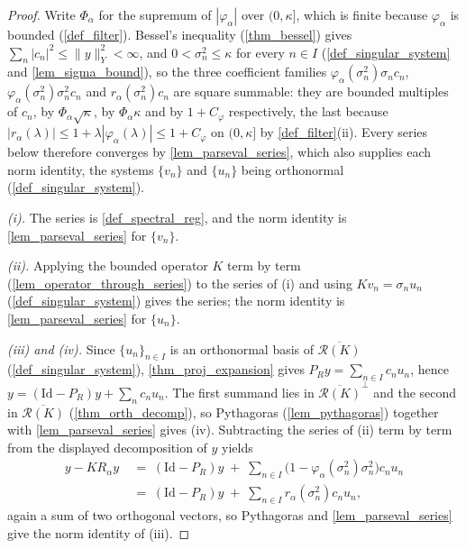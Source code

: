 \documentclass[a4paper]{report}
\theoremstyle{plain}
\theoremstyle{definition}
\theoremstyle{remark}
\newcommand{\Ran}{\mathcal{R}}
\newcommand{\Id}{\mathrm{Id}}
\begin{document}
\begin{proof}
  Write $\Phi_{\alpha}$ for the supremum of $|\varphi_{\alpha}|$ over $(0,\kappa]$,
  which is finite because $\varphi_{\alpha}$ is bounded (\cref{def_filter}).  Bessel's
  inequality
  (\cref{thm_bessel}) gives $\sum_n |c_n|^{2} \le \|y\|_Y^{2} < \infty$, and
  $0 < \sigma_n^{2} \le \kappa$ for every $n \in I$ (\cref{def_singular_system} and
  \cref{lem_sigma_bound}), so the three
  coefficient families $\varphi_{\alpha}(\sigma_n^{2})\sigma_nc_n$,
  $\varphi_{\alpha}(\sigma_n^{2})\sigma_n^{2}c_n$ and $r_{\alpha}(\sigma_n^{2})c_n$ are
  square summable: they are bounded multiples of $c_n$, by $\Phi_{\alpha}\sqrt{\kappa}$,
  by $\Phi_{\alpha}\kappa$ and by $1 + C_{\varphi}$ respectively, the last because
  $|r_{\alpha}(\lambda)| \le 1 + \lambda|\varphi_{\alpha}(\lambda)| \le 1 + C_{\varphi}$
  on $(0,\kappa]$ by \cref{def_filter}(ii).  Every series below therefore converges by
  \cref{lem_parseval_series}, which also supplies each norm identity, the systems
  $\{v_n\}$ and $\{u_n\}$ being orthonormal (\cref{def_singular_system}).

  \emph{(i).}  The series is \cref{def_spectral_reg}, and the norm identity is
  \cref{lem_parseval_series} for $\{v_n\}$.

  \emph{(ii).}  Applying the bounded operator $K$ term by term
  (\cref{lem_operator_through_series}) to the series of (i) and using $Kv_n = \sigma_nu_n$
  (\cref{def_singular_system}) gives the series; the norm identity is
  \cref{lem_parseval_series} for $\{u_n\}$.

  \emph{(iii) and (iv).}  Since $\{u_n\}_{n \in I}$ is an orthonormal basis of
  $\overline{\Ran(K)}$ (\cref{def_singular_system}), \cref{thm_proj_expansion} gives
  $P_Ry = \sum_{n \in I}c_nu_n$, hence $y = (\Id - P_R)y + \sum_n c_nu_n$.  The first
  summand lies in $\overline{\Ran(K)}^{\perp}$ and the second in $\overline{\Ran(K)}$
  (\cref{thm_orth_decomp}), so Pythagoras (\cref{lem_pythagoras}) together with
  \cref{lem_parseval_series} gives (iv).  Subtracting the series of (ii) term by term
  from the displayed decomposition of $y$ yields
  \[
    \begin{aligned}
      y - KR_{\alpha}y &\;=\; (\Id - P_R)y \;+\; \sum_{n \in I}
        \bigl(1 - \varphi_{\alpha}(\sigma_n^{2})\sigma_n^{2}\bigr)c_nu_n \\
        &\;=\; (\Id - P_R)y \;+\; \sum_{n \in I}r_{\alpha}(\sigma_n^{2})c_nu_n ,
    \end{aligned}
  \]
  again a sum of two orthogonal vectors, so Pythagoras and \cref{lem_parseval_series}
  give the norm identity of (iii).
\end{proof}
\end{document}
